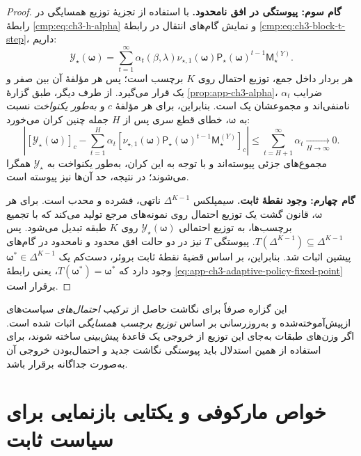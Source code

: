 \begin{proof}
\textbf{گام سوم: پیوستگی در افق نامحدود.}
با استفاده از تجزیهٔ توزیع همسایگی در
رابطهٔ \eqref{cmp:eq:ch3-h-alpha} و
نمایش گام‌های انتقال در
رابطهٔ \eqref{cmp:eq:ch3-block-t-step}، داریم:
\begin{equation}\label{eq:app-ch3-adaptive-policy-infinite-output}
\mathscr Y_\star(\boldsymbol{\omega})
=\sum_{t=1}^{\infty}\alpha_t(\beta,\lambda)
\nu_{\star,1}(\boldsymbol{\omega})
\mathsf P_\star(\boldsymbol{\omega})^{t-1}
\mathsf M_\star^{(Y)}.
\end{equation}
هر بردار داخل جمع، توزیع احتمال روی $K$ برچسب است؛
پس هر مؤلفهٔ آن بین صفر و یک قرار می‌گیرد.
از طرف دیگر، طبق گزارهٔ
\ref{prop:app-ch3-alpha}،
ضرایب $\alpha_t$ نامنفی‌اند و مجموعشان یک است.
بنابراین، برای هر مؤلفهٔ $c$ و \emph{به‌طور یکنواخت}
نسبت به $\boldsymbol{\omega}$، خطای قطع سری پس از
$H$ جمله چنین کران می‌خورد:
\begin{equation}\label{eq:app-ch3-adaptive-policy-uniform-tail}
\boxed{
\left|
[\mathscr Y_\star(\boldsymbol{\omega})]_c-
\sum_{t=1}^{H}\alpha_t
\left[
\nu_{\star,1}(\boldsymbol{\omega})
\mathsf P_\star(\boldsymbol{\omega})^{t-1}
\mathsf M_\star^{(Y)}
\right]_c
\right|
\le\sum_{t=H+1}^{\infty}\alpha_t
\xrightarrow[H\to\infty]{}0.
}
\end{equation}
مجموع‌های جزئی پیوسته‌اند و با توجه به این کران،
به‌طور یکنواخت به $\mathscr Y_\star$ همگرا می‌شوند؛
در نتیجه، حد آن‌ها نیز پیوسته است.

\textbf{گام چهارم: وجود نقطهٔ ثابت.}
سیمپلکس $\Delta^{K-1}$ ناتهی، فشرده و محدب است.
برای هر $\boldsymbol{\omega}$، قانون گشت
یک توزیع احتمال روی نمونه‌های مرجع تولید می‌کند
که با تجمیع برچسب‌ها، به توزیع احتمالی
$\mathscr Y_\star(\boldsymbol{\omega})$
روی $K$ طبقه تبدیل می‌شود. پس
$T(\Delta^{K-1})\subseteq\Delta^{K-1}$.
پیوستگی $T$ نیز در دو حالت افق محدود و نامحدود
در گام‌های پیشین اثبات شد. بنابراین، بر اساس
قضیهٔ نقطهٔ ثابت بروئر، دست‌کم یک
$\boldsymbol{\omega}^{\ast}\in\Delta^{K-1}$
وجود دارد که $T(\boldsymbol{\omega}^{\ast})
=\boldsymbol{\omega}^{\ast}$، یعنی
رابطهٔ \eqref{eq:app-ch3-adaptive-policy-fixed-point}
برقرار است.
\end{proof}

این گزاره صرفاً برای نگاشت حاصل از ترکیب \emph{احتمال‌های}
سیاست‌های ازپیش‌آموخته‌شده و به‌روزرسانی بر اساس
\emph{توزیع برچسب همسایگی} اثبات شده است.
اگر وزن‌های طبقات به‌جای این توزیع از خروجی یک قاعدهٔ
پیش‌بینی ساخته شوند، برای استفاده از همین استدلال
باید پیوستگی نگاشت جدید و احتمال‌بودن خروجی آن
به‌صورت جداگانه برقرار باشد.

\section{خواص مارکوفی و یکتایی بازنمایی برای سیاست ثابت}
\label{app:ch3-policy-center-markov}


